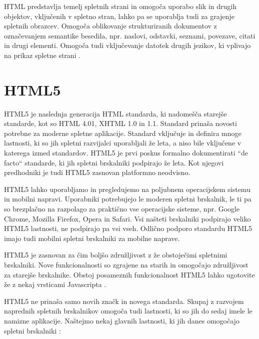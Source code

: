 \documentclass[a4paper, 12pt]{book}
\begin{document}
HTML predstavlja temelj spletnih strani in omogo\v ca uporabo slik in drugih objektov, vklju\v cenih v spletno stran, lahko pa se uporablja tudi za grajenje spletnih obrazcev. Omogo\v ca oblikovanje strukturiranih dokumentov z ozna\v cevanjem semantike besedila, npr. naslovi, odstavki, seznami, povezave, citati in drugi elementi. Omogo\v ca tudi vklju\v cevanje datotek drugih jezikov, ki vplivajo na prikaz spletne strani
\cite{wikipedia-html}.

\section{HTML5}
HTML5 je naslednja generacija HTML standarda, ki nadome\v s\v ca starej\v se standarde, kot so HTML 4.01, XHTML 1.0 in 1.1. Standard prina\v sa novosti potrebne za moderne spletne aplikacije. Standard vklju\v cuje in definira mnoge lastnosti, ki so jih spletni razvijalci uporabljali \v ze leta, a niso bile vklju\v cene v katerega izmed standardov. HTML5 je prvi poskus formalno dokumentirati ``de facto`` standarde, ki jih spletni brskalniki podpirajo \v ze leta. Kot njegovi predhodniki je tudi HTML5 zasnovan platformno neodvisno.

HTML5 lahko uporabljamo in pregledujemo na poljubnem operacijskem sistemu in mobilni napravi. Uporabniki potrebujejo le moderen spletni brskalnik, le ti pa so brezpla\v cno na razpolago za prakti\v cno vse operacijske sisteme, npr. Google Chrome, Mozilla Firefox, Opera in Safari. Vsi na\v steti brskalniki podpirajo veliko HTML5 lastnosti, ne podpirajo pa vsi vseh. Odli\v cno podporo standardu HTML5 imajo tudi mobilni spletni brskalniki za mobilne naprave.

HTML5 je zasnovan za \v cim bolj\v so zdru\v zljivost z \v ze obstoje\v cimi spletnimi
brskalniki. Nove funkcionalnosti so zgrajene na starih in omogo\v cajo zdru\v zljivost
za starej\v se brskalnike. Obstoj posameznih funkcionalnost
HTML5 lahko ugotovite \v ze z nekaj vrsticami Javascripta \cite{html5}.

HTML5 ne prina\v sa samo novih zna\v ck in novega standarda. Skupaj z razvojem naprednih spletnih brskalnikov omogo\v ca tudi lastnosti, ki so jih do sedaj imele le namizne aplikacije. Na\v stejmo nekaj glavnih lastnosti, ki jih danes omogo\v cajo spletni brskalniki
\cite{html5rocks}:
\end{document}
